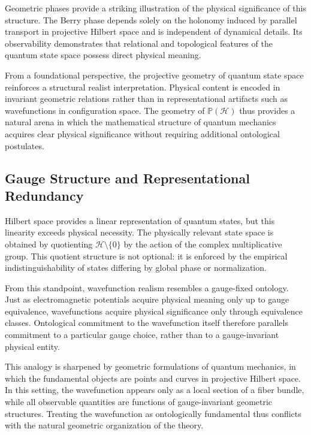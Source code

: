 \documentclass[11pt]{article}
\begin{document}
Geometric phases provide a striking illustration of the physical significance of this structure. The Berry phase depends solely on the holonomy induced by parallel transport in projective Hilbert space and is independent of dynamical details. Its observability demonstrates that relational and topological features of the quantum state space possess direct physical meaning.

From a foundational perspective, the projective geometry of quantum state space reinforces a structural realist interpretation. Physical content is encoded in invariant geometric relations rather than in representational artifacts such as wavefunctions in configuration space. The geometry of $\mathbb{P}(\mathcal{H})$ thus provides a natural arena in which the mathematical structure of quantum mechanics acquires clear physical significance without requiring additional ontological postulates.
\subsection*{Gauge Structure and Representational Redundancy}

Hilbert space provides a linear representation of quantum states, but this linearity exceeds physical necessity. The physically relevant state space is obtained by quotienting $\mathcal{H} \setminus \{0\}$ by the action of the complex multiplicative group. This quotient structure is not optional: it is enforced by the empirical indistinguishability of states differing by global phase or normalization.

From this standpoint, wavefunction realism resembles a gauge-fixed ontology. Just as electromagnetic potentials acquire physical meaning only up to gauge equivalence, wavefunctions acquire physical significance only through equivalence classes. Ontological commitment to the wavefunction itself therefore parallels commitment to a particular gauge choice, rather than to a gauge-invariant physical entity.

This analogy is sharpened by geometric formulations of quantum mechanics, in which the fundamental objects are points and curves in projective Hilbert space. In this setting, the wavefunction appears only as a local section of a fiber bundle, while all observable quantities are functions of gauge-invariant geometric structures. Treating the wavefunction as ontologically fundamental thus conflicts with the natural geometric organization of the theory.
\end{document}
